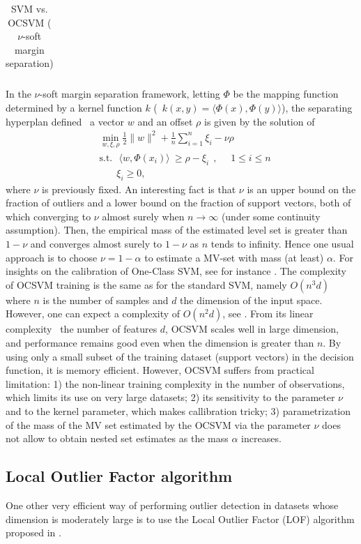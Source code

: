 \begin{table}[h!]
\begin{tabular}{|c|c|}
              
  \end{tabular}
  \caption{SVM vs. OCSVM ($\nu$-soft margin separation)}
  \label{table:OCSVM-soft}
\end{table}

In the $\nu$-soft margin separation framework, letting $\Phi$ be the mapping function determined by a kernel function $k$ (\ie~$k(x,y) = \langle \Phi(x), \Phi(y)\rangle$), the separating hyperplan defined \wrt~a vector $w$ and an offset $\rho$ is given by the solution of 
\begin{align*}
&\min_{w,\xi,\rho} \frac{1}{2} \|w\|^2 + \frac{1}{n} \sum_{i=1}^n \xi_i - \nu \rho\\
&\text{s.t.}~~~ \langle w, \Phi(x_i)\rangle ~\ge \rho - \xi_i~~,~~~~~~1 \le i \le n \\
& ~~~~~~~~\xi_i \ge 0,
\end{align*}
where $\nu$ is previously fixed. An interesting fact is that $\nu$ is an upper bound on the fraction of outliers and a lower bound on the fraction of support vectors, both of which converging to $\nu$ almost surely when $n \to \infty$ (under some continuity assumption). Then, the empirical mass of the estimated level set is greater than $1-\nu$ and converges almost surely to $1-\nu$ as $n$ tends to infinity. Hence one usual approach is to choose $\nu = 1 - \alpha$ to estimate a MV-set with mass (at least) $\alpha$. For insights on the calibration of One-Class SVM, see for instance \cite{Thomas2015}.
%
The complexity of OCSVM training is the same as for the standard SVM, namely $O(n^3 d)$ where $n$ is the number of samples and $d$ the dimension of the input space. However, one can expect a complexity of $O(n^2 d)$, see \cite{Bottou2007}. From its linear complexity \wrt~the number of features $d$, OCSVM scales well in large dimension, and performance remains good even when the dimension is greater than $n$. By using only a small subset of the training dataset (support vectors) in the decision function, it is memory efficient. However, OCSVM suffers from practical limitation: 1) the non-linear training complexity in the number of observations, which limits its use on very large datasets; 2) its sensitivity to the parameter $\nu$ and to the kernel parameter, which makes callibration tricky; 3)
parametrization of the mass of the MV set estimated by the OCSVM via the parameter $\nu$ does not allow to obtain nested set estimates as the mass $\alpha$ increases.  

\subsection{Local Outlier Factor algorithm}
One other very efficient way of performing outlier detection in datasets whose dimension is moderately large is to use the Local Outlier Factor (LOF) algorithm proposed in \cite{Breunig2000LOF}.


